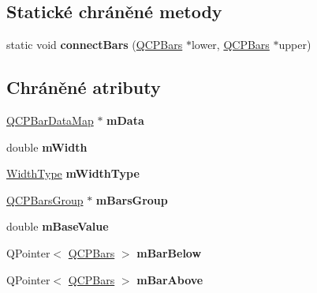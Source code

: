 \subsection*{Statické chráněné metody}
\begin{DoxyCompactItemize}
\item 
\hypertarget{classQCPBars_a6ea37802cd22f97235cab614b14b9f19}{}static void {\bfseries connect\+Bars} (\hyperlink{classQCPBars}{Q\+C\+P\+Bars} $\ast$lower, \hyperlink{classQCPBars}{Q\+C\+P\+Bars} $\ast$upper)\label{classQCPBars_a6ea37802cd22f97235cab614b14b9f19}

\end{DoxyCompactItemize}
\subsection*{Chráněné atributy}
\begin{DoxyCompactItemize}
\item 
\hypertarget{classQCPBars_aef28d29d51ef84b608ecd22c55d531ff}{}\hyperlink{qcustomplot_8h_aa846c77472cae93def9f1609d0c57191}{Q\+C\+P\+Bar\+Data\+Map} $\ast$ {\bfseries m\+Data}\label{classQCPBars_aef28d29d51ef84b608ecd22c55d531ff}

\item 
\hypertarget{classQCPBars_a7c4e0f2246f8133f48a9c3f24cf5b920}{}double {\bfseries m\+Width}\label{classQCPBars_a7c4e0f2246f8133f48a9c3f24cf5b920}

\item 
\hypertarget{classQCPBars_a94dba1309496c7601d01e2c59715cbb3}{}\hyperlink{classQCPBars_a65dbbf1ab41cbe993d71521096ed4649}{Width\+Type} {\bfseries m\+Width\+Type}\label{classQCPBars_a94dba1309496c7601d01e2c59715cbb3}

\item 
\hypertarget{classQCPBars_a9f59c255f3739182ca9744dff75beaa9}{}\hyperlink{classQCPBarsGroup}{Q\+C\+P\+Bars\+Group} $\ast$ {\bfseries m\+Bars\+Group}\label{classQCPBars_a9f59c255f3739182ca9744dff75beaa9}

\item 
\hypertarget{classQCPBars_aa0515cf47fa6044cc28e59b1ae5ec759}{}double {\bfseries m\+Base\+Value}\label{classQCPBars_aa0515cf47fa6044cc28e59b1ae5ec759}

\item 
\hypertarget{classQCPBars_ad51db970eed7e286f2753b0216fc56de}{}Q\+Pointer$<$ \hyperlink{classQCPBars}{Q\+C\+P\+Bars} $>$ {\bfseries m\+Bar\+Below}\label{classQCPBars_ad51db970eed7e286f2753b0216fc56de}

\item 
\hypertarget{classQCPBars_a0c1c46076c41a478dbb373cfd35929aa}{}Q\+Pointer$<$ \hyperlink{classQCPBars}{Q\+C\+P\+Bars} $>$ {\bfseries m\+Bar\+Above}\label{classQCPBars_a0c1c46076c41a478dbb373cfd35929aa}

\end{DoxyCompactItemize}
